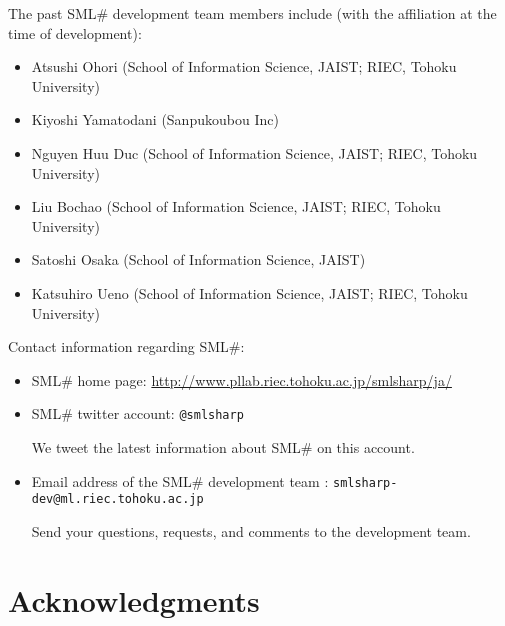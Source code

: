 \documentclass{jbook}
\newcommand{\txt}[2]{#2}
\newcommand{\smlsharp}{SML\#}
\begin{document}
	The past \smlsharp{} development team members include (with the
affiliation at the time of development):
\begin{itemize}
\item Atsushi Ohori (School of Information Science, JAIST; RIEC, Tohoku University)
\item Kiyoshi Yamatodani (Sanpukoubou Inc)
\item Nguyen Huu Duc (School of Information Science, JAIST; RIEC, Tohoku University)
\item Liu Bochao (School of Information Science, JAIST; RIEC, Tohoku University)
\item Satoshi Osaka (School of Information Science, JAIST)
\item Katsuhiro Ueno (School of Information Science, JAIST; RIEC, Tohoku University)
\end{itemize}

	Contact information regarding \smlsharp{}:
\begin{itemize}
\item \smlsharp{} home page:
\url{http://www.pllab.riec.tohoku.ac.jp/smlsharp/ja/}

%


\item \smlsharp{} twitter account:
{\tt @smlsharp}

	We tweet the latest information about \smlsharp{} on this account.
	
\item Email address of the \smlsharp{} development team :
{\tt smlsharp-dev@ml.riec.tohoku.ac.jp}

Send your questions, requests, and comments to the development team.
\end{itemize}
\fi%

\section{\txt{謝辞}{Acknowledgments}}
\label{sec:acknowledgements}
	
\end{document}

